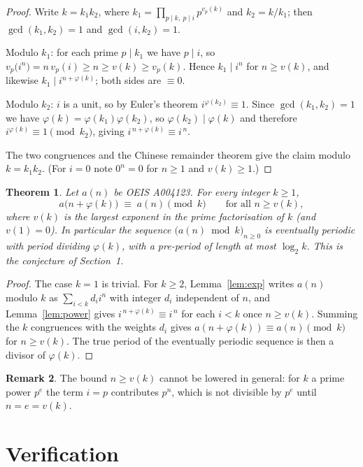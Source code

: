 \documentclass[11pt,a4paper]{article}
\theoremstyle{plain}
\newtheorem{theorem}{Theorem}
\theoremstyle{definition}
\newtheorem{remark}[theorem]{Remark}
\begin{document}
\begin{proof}
Write $k=k_1k_2$, where $k_1=\prod_{p\mid k,\ p\mid i}p^{v_p(k)}$ and $k_2=k/k_1$; then
$\gcd(k_1,k_2)=1$ and $\gcd(i,k_2)=1$.

Modulo $k_1$: for each prime $p\mid k_1$ we have $p\mid i$, so
$v_p\bigl(i^{n}\bigr)=n\,v_p(i)\ge n\ge v(k)\ge v_p(k)$. Hence $k_1\mid i^{n}$ for
$n\ge v(k)$, and likewise $k_1\mid i^{n+\varphi(k)}$; both sides are $\equiv 0$.

Modulo $k_2$: $i$ is a unit, so by Euler's theorem $i^{\varphi(k_2)}\equiv 1$. Since
$\gcd(k_1,k_2)=1$ we have $\varphi(k)=\varphi(k_1)\varphi(k_2)$, so
$\varphi(k_2)\mid\varphi(k)$ and therefore $i^{\varphi(k)}\equiv 1 \pmod{k_2}$, giving
$i^{\,n+\varphi(k)}\equiv i^{\,n}$.

The two congruences and the Chinese remainder theorem give the claim modulo $k=k_1k_2$.
(For $i=0$ note $0^{n}=0$ for $n\ge 1$ and $v(k)\ge1$.)
\end{proof}

\begin{theorem}\label{thm:main}
Let $a(n)$ be OEIS A004123. For every integer $k\ge1$,
\[
a\bigl(n+\varphi(k)\bigr)\;\equiv\;a(n)\pmod{k}\qquad\text{for all } n\ge v(k),
\]
where $v(k)$ is the largest exponent in the prime factorisation of $k$ (and $v(1)=0$).
In particular the sequence $\bigl(a(n)\bmod k\bigr)_{n\ge0}$ is eventually periodic with
period dividing $\varphi(k)$, with a pre-period of length at most $\log_2 k$. This is the
conjecture of Section~1.
\end{theorem}

\begin{proof}
The case $k=1$ is trivial. For $k\ge2$, Lemma~\ref{lem:exp} writes $a(n)$ modulo $k$ as
$\sum_{i<k}d_i i^{n}$ with integer $d_i$ independent of $n$, and Lemma~\ref{lem:power}
gives $i^{\,n+\varphi(k)}\equiv i^{\,n}$ for each $i<k$ once $n\ge v(k)$. Summing the
$k$ congruences with the weights $d_i$ gives
$a(n+\varphi(k))\equiv a(n)\pmod k$ for $n\ge v(k)$. The true period of the eventually
periodic sequence is then a divisor of $\varphi(k)$.
\end{proof}

\begin{remark}
The bound $n\ge v(k)$ cannot be lowered in general: for $k$ a prime power $p^{e}$ the
term $i=p$ contributes $p^{n}$, which is not divisible by $p^{e}$ until $n=e=v(k)$.
\end{remark}

\section{Verification}
\end{document}
